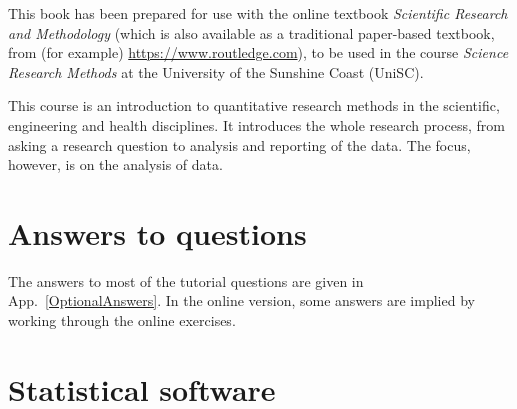 \documentclass[
  11pt,
  a4paper,
  krantz2]{krantz}
\begin{document}
\newcommand{\cms}{\,\text{cm}}
\newcommand{\dLs}{\,\text{dL}}
\newcommand{\xdLs}{\text{dL}}

\newcommand{\fmols}{\,\text{fmol}}
\newcommand{\gs}{\,\text{g}}
\newcommand{\hs}{\,\text{h}}
\newcommand{\xhs}{\text{h}}

\newcommand{\has}{\,\text{ha}}
\newcommand{\xhas}{\text{ha}}

\newcommand{\kgs}{\,\text{kg}}
\newcommand{\kms}{\,\text{km}}
\newcommand{\kWhs}{\,\text{kWh}}
\newcommand{\lbs}{\,\text{lb}}
\newcommand{\Ls}{\,\text{L}}
\newcommand{\xLs}{\text{L}}

\newcommand{\mgs}{\,\text{mg}}
\newcommand{\mls}{\,\text{mL}}
\newcommand{\microgs}{\,\ensuremath{\mu}\text{g}}
\newcommand{\millis}{\,\text{ms}}
\newcommand{\mins}{\,\text{mins}}
\newcommand{\mJs}{\,\text{mJ}}
\newcommand{\MPas}{\,\text{MPa}}
\newcommand{\mmols}{\,\text{mmol}}
\newcommand{\mLs}{\,\text{mL}}
\newcommand{\mms}{\,\text{mm}}
\newcommand{\ms}{\,\text{m}}
\newcommand{\xms}{\text{m}}
\newcommand{\ozs}{\,\text{oz}}
\newcommand{\secs}{\,\text{s}}
\newcommand{\xsecs}{\text{s}}
\newcommand{\ppms}{\,\text{ppm}}
\newcommand{\ys}{\,\text{y}}
\newcommand{\vs}{\,\text{V}}

This book has been prepared for use with the online textbook
\textit{Scientific Research and Methodology}
(which is also available as a traditional
paper-based textbook, from (for example) \url{https://www.routledge.com}),
to be used in the course \emph{Science Research Methods} at the
University of the Sunshine Coast (UniSC).

This course is an introduction to quantitative research methods in the scientific, engineering and health disciplines.
It introduces the whole research process,
from asking a research question to analysis and reporting of the data.
The focus, however, is on the analysis of data.

\section*{Answers to questions}\label{answers-to-questions}


The answers to most of the tutorial questions are given in App.~\ref{OptionalAnswers}.
In the online version, some answers are implied by working through the online exercises.

\section*{Statistical software}\label{statistical-software}
\end{document}
